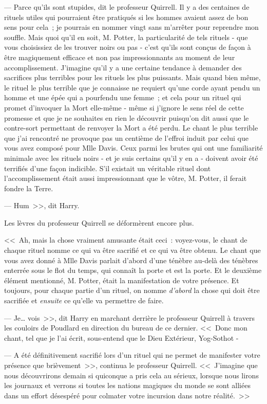 --- Parce qu'ils sont stupides, dit le professeur Quirrell. Il y a des centaines de rituels utiles qui pourraient être pratiqués si les hommes avaient assez de bon sens pour cela~; je pourrais en nommer vingt sans m'arrêter pour reprendre mon souffle. Mais quoi qu'il en soit, M. Potter, la particularité de tels rituels - que vous choisissiez de les trouver noirs ou pas - c'est qu'ils sont conçus de façon à être magiquement efficace et non pas impressionnants au moment de leur accomplissement. J'imagine qu'il y a une certaine tendance à demander des sacrifices plus terribles pour les rituels les plus puissants. Mais quand bien même, le rituel le plus terrible que je connaisse ne requiert qu'une corde ayant pendu un homme et une épée qui a pourfendu une femme~; et cela pour un rituel qui promet d'invoquer la Mort elle-même - même si j'ignore le sens réel de cette promesse et que je ne souhaites en rien le découvrir puisqu'on dit aussi que le contre-sort permettant de renvoyer la Mort a été perdu. Le chant le plus terrible que j'ai rencontré ne provoque pas un centième de l'effroi induit par celui que vous avez composé pour Mlle Davis. Ceux parmi les brutes qui ont une familiarité minimale avec les rituels noirs - et je suis certains qu'il y en a - doivent avoir été terrifiés d'une façon indicible. S'il existait un véritable rituel dont l'accomplissement était aussi impressionnant que le vôtre, M. Potter, il ferait fondre la Terre.

--- Hum~>>, dit Harry.

Les lèvres du professeur Quirrell se déformèrent encore plus.

<<~Ah, mais la chose vraiment amusante était ceci~: voyez-vous, le chant de chaque rituel nomme ce qui va être sacrifié et ce qui va être obtenu. Le chant que vous avez donné à Mlle Davis parlait d'abord d'une ténèbre au-delà des ténèbres enterrée sous le flot du temps, qui connaît la porte et est la porte. Et le deuxième élément mentionné, M. Potter, était la manifestation de votre présence. Et toujours, pour chaque partie d'un rituel, on nomme \emph{d'abord} la chose qui doit être sacrifiée et \emph{ensuite} ce qu'elle va permettre de faire.

--- Je… vois~>>, dit Harry en marchant derrière le professeur Quirrell à travers les couloirs de Poudlard en direction du bureau de ce dernier. <<~Donc mon chant, tel que je l'ai écrit, sous-entend que le Dieu Extérieur, Yog-Sothot -

--- A été définitivement sacrifié lors d'un rituel qui ne permet de manifester votre présence que brièvement~>>, continua le professeur Quirrell. <<~J'imagine que nous découvrirons demain si quiconque a pris cela au sérieux, lorsque nous lirons les journaux et verrons si toutes les nations magiques du monde se sont alliées dans un effort désespéré pour colmater votre incursion dans notre réalité.~>>

